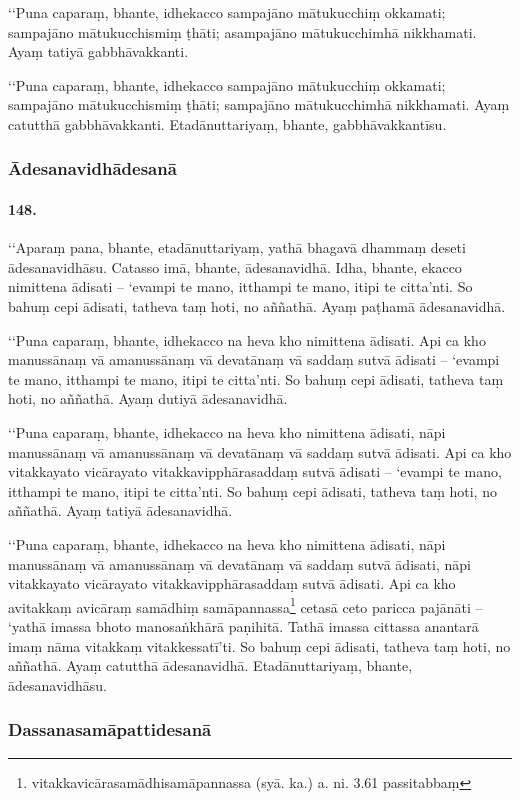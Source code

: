 ‘‘Puna caparaṃ, bhante, idhekacco sampajāno mātukucchiṃ okkamati; sampajāno mātukucchismiṃ ṭhāti; asampajāno mātukucchimhā nikkhamati. Ayaṃ tatiyā gabbhāvakkanti.

‘‘Puna caparaṃ, bhante, idhekacco sampajāno mātukucchiṃ okkamati; sampajāno mātukucchismiṃ ṭhāti; sampajāno mātukucchimhā nikkhamati. Ayaṃ catutthā gabbhāvakkanti. Etadānuttariyaṃ, bhante, gabbhāvakkantīsu.

\subsubsection{Ādesanavidhādesanā}

\paragraph{148.} ‘‘Aparaṃ pana, bhante, etadānuttariyaṃ, yathā bhagavā dhammaṃ deseti ādesanavidhāsu. Catasso imā, bhante, ādesanavidhā. Idha, bhante, ekacco nimittena ādisati – ‘evampi te mano, itthampi te mano, itipi te citta’nti. So bahuṃ cepi ādisati, tatheva taṃ hoti, no aññathā. Ayaṃ paṭhamā ādesanavidhā.

‘‘Puna caparaṃ, bhante, idhekacco na heva kho nimittena ādisati. Api ca kho manussānaṃ vā amanussānaṃ vā devatānaṃ vā saddaṃ sutvā ādisati – ‘evampi te mano, itthampi te mano, itipi te citta’nti. So bahuṃ cepi ādisati, tatheva taṃ hoti, no aññathā. Ayaṃ dutiyā ādesanavidhā.

‘‘Puna caparaṃ, bhante, idhekacco na heva kho nimittena ādisati, nāpi manussānaṃ vā amanussānaṃ vā devatānaṃ vā saddaṃ sutvā ādisati. Api ca kho vitakkayato vicārayato vitakkavipphārasaddaṃ sutvā ādisati – ‘evampi te mano, itthampi te mano, itipi te citta’nti. So bahuṃ cepi ādisati, tatheva taṃ hoti, no aññathā. Ayaṃ tatiyā ādesanavidhā.

‘‘Puna caparaṃ, bhante, idhekacco na heva kho nimittena ādisati, nāpi manussānaṃ vā amanussānaṃ vā devatānaṃ vā saddaṃ sutvā ādisati, nāpi vitakkayato vicārayato vitakkavipphārasaddaṃ sutvā ādisati. Api ca kho avitakkaṃ avicāraṃ samādhiṃ samāpannassa\footnote{vitakkavicārasamādhisamāpannassa (syā. ka.) a. ni. 3.61 passitabbaṃ} cetasā ceto paricca pajānāti – ‘yathā imassa bhoto manosaṅkhārā paṇihitā. Tathā imassa cittassa anantarā imaṃ nāma vitakkaṃ vitakkessatī’ti. So bahuṃ cepi ādisati, tatheva taṃ hoti, no aññathā. Ayaṃ catutthā ādesanavidhā. Etadānuttariyaṃ, bhante, ādesanavidhāsu.

\subsubsection{Dassanasamāpattidesanā}

